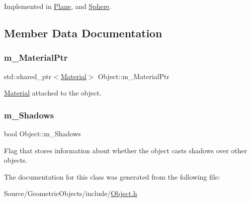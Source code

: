 Implemented in \hyperlink{class_plane_a21f6adf1c2be7853a61e1f8d811b76eb}{Plane}, and \hyperlink{class_sphere_ac3b3cc027f0cd8c89cecc3b65799267d}{Sphere}.



\subsection{Member Data Documentation}
\hypertarget{class_object_aa79a61ad1ff44b1585cc4972034cecbe}{}\label{class_object_aa79a61ad1ff44b1585cc4972034cecbe} 
\subsubsection{\texorpdfstring{m\+\_\+\+Material\+Ptr}{m\_MaterialPtr}}
{\footnotesize\ttfamily std\+::shared\+\_\+ptr$<$\hyperlink{class_material}{Material}$>$ Object\+::m\+\_\+\+Material\+Ptr\hspace{0.3cm}{\ttfamily [protected]}}

\hyperlink{class_material}{Material} attached to the object. \hypertarget{class_object_a7cde4bccf1989da90c2d2b463876e179}{}\label{class_object_a7cde4bccf1989da90c2d2b463876e179} 
\subsubsection{\texorpdfstring{m\+\_\+\+Shadows}{m\_Shadows}}
{\footnotesize\ttfamily bool Object\+::m\+\_\+\+Shadows\hspace{0.3cm}{\ttfamily [protected]}}

Flag that stores information about whether the object casts shadows over other objects. 

The documentation for this class was generated from the following file\+:\begin{DoxyCompactItemize}
\item 
Source/\+Geometric\+Objects/include/\hyperlink{_object_8h}{Object.\+h}\end{DoxyCompactItemize}
